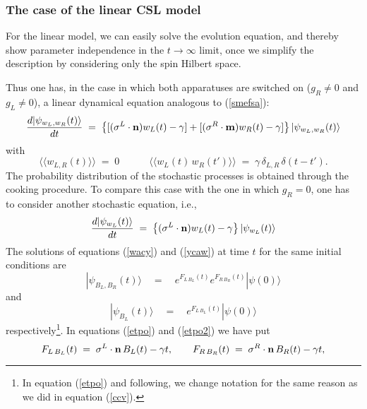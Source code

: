 \documentclass[10pt,a4paper]{article}
\newcommand{\llangle}{\langle\!\langle}
\newcommand{\rrangle}{\rangle\!\rangle}
\begin{document}
\subsubsection{The case of the linear CSL model} \label{sec1132}

For the linear model, we can easily solve the evolution equation,
and thereby show parameter independence in the $t \rightarrow
\infty$ limit, once we simplify the description by considering
only the spin Hilbert space.

Thus one has, in the case in which both apparatuses are switched
on ($g_{R} \neq 0$ and $g_{L} \neq 0$), a linear dynamical
equation analogous to (\ref{smefsa}):
\begin{equation} \label{wacy}
\frac{d|\psi_{w_{L},w_{R}}(t)\rangle}{dt} \; = \; \left\{ [ ({\bf
\sigma}^{L}\cdot {\bf n})w_{L}(t) - \gamma] + [ ({\bf
\sigma}^{R}\cdot {\bf m})w_{R}(t) - \gamma] \right\}
|\psi_{w_{L},w_{R}}(t)\rangle
\end{equation}
with
\begin{equation}
\llangle w_{L,R}(t)\rrangle \; = \; 0 \qquad\quad \llangle
w_{L}(t)\, w_{R}(t')\rrangle \; = \; \gamma\, \delta_{L,R}\,
\delta(t - t').
\end{equation}
The probability distribution of the stochastic processes is
obtained through the cooking procedure. To compare this case with
the one in which $g_{R} = 0$, one has to consider another
stochastic equation, i.e.,
\begin{equation} \label{ycaw}
\frac{d|\psi_{w_{L}}(t)\rangle}{dt} \; = \; \left\{ ({\bf
\sigma}^{L}\cdot {\bf n})w_{L}(t) - \gamma  \right\}
|\psi_{w_{L}}(t)\rangle
\end{equation}
The solutions of equations (\ref{wacy}) and (\ref{ycaw}) at time
$t$ for the same initial conditions are
\begin{equation} \label{etpo}
|\psi_{B_{L}, B_{R}}(t)\rangle \quad = \quad e^{\displaystyle
F_{L\, B_{L}}(t)} e^{\displaystyle F_{R\, B_{R}}(t)}
|\psi(0)\rangle
\end{equation}
and
\begin{equation} \label{etpo2}
|\psi_{B_{L}}(t)\rangle \quad = \quad e^{\displaystyle F_{L\,
B_{L}}(t)} |\psi(0)\rangle
\end{equation}
respectively\footnote{In equation (\ref{etpo}) and following, we
change notation for the same reason as we did in equation
(\ref{ccv}).}. In equations (\ref{etpo}) and (\ref{etpo2}) we have
put
\begin{equation}
F_{L\, B_{L}}(t) \; = \; {\bf \sigma}^{L}\cdot{\bf n}\, B_{L}(t) -
\gamma t, \qquad F_{R\, B_{R}}(t) \; = \; {\bf
\sigma}^{R}\cdot{\bf n}\, B_{R}(t) - \gamma t,
\end{equation}
\end{document}
